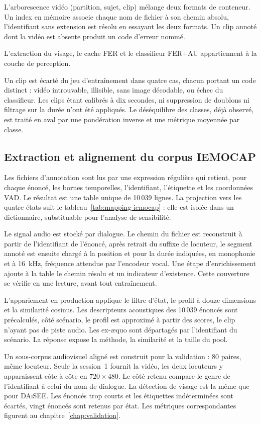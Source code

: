 L'arborescence vidéo (partition, sujet, clip) mélange deux formats de
conteneur. Un index en mémoire associe chaque nom de fichier à son
chemin absolu, l'identifiant sans extension est résolu en essayant
les deux formats. Un clip annoté dont la vidéo est absente produit un
code d'erreur nommé.

L'extraction du visage, le cache FER et le classifieur FER+AU
appartiennent à la couche de perception.

Un clip est écarté du jeu d'entraînement dans quatre cas, chacun
portant un code distinct : vidéo introuvable, illisible, sans image
décodable, ou échec du classifieur. Les clips étant calibrés à dix
secondes, ni suppression de doublons ni filtrage sur la durée n'ont
été appliqués. Le déséquilibre des classes, déjà observé, est traité
en aval par une pondération inverse et une métrique moyennée par
classe.

\subsection{Extraction et alignement du corpus IEMOCAP}
\label{subsec:impl-iemocap}

Les fichiers d'annotation sont lus par une expression régulière qui
retient, pour chaque énoncé, les bornes temporelles, l'identifiant,
l'étiquette et les coordonnées VAD. Le résultat est une table unique
de 10\,039 lignes. La projection vers les quatre états suit le
tableau~\ref{tab:mapping-iemocap} : elle est isolée dans un
dictionnaire, substituable pour l'analyse de sensibilité.

Le signal audio est stocké par dialogue. Le chemin du fichier est
reconstruit à partir de l'identifiant de l'énoncé, après retrait du
suffixe de locuteur, le segment annoté est ensuite chargé à la
position et pour la durée indiquées, en monophonie et à 16~kHz,
fréquence attendue par l'encodeur vocal. Une étape d'enrichissement
ajoute à la table le chemin résolu et un indicateur d'existence.
Cette couverture se vérifie en une lecture, avant tout entraînement.

L'appariement en production applique le filtre d'état, le profil à
douze dimensions et la similarité cosinus. Les descripteurs
acoustiques des 10\,039 énoncés sont précalculés, côté scénario, le
profil est approximé à partir des scores, le clip n'ayant pas de
piste audio. Les ex-æquo sont départagés par l'identifiant du
scénario. La réponse expose la méthode, la similarité et la taille
du pool.

Un sous-corpus audiovisuel aligné est construit pour la validation :
80 paires, même locuteur. Seule la session~1 fournit la vidéo, les
deux locuteurs y apparaissent côte à côte en $720 \times 480$. Le
côté retenu compare le genre de l'identifiant à celui du nom de
dialogue. La détection de visage est la même que pour
\textsc{DAiSEE}. Les énoncés trop courts et les étiquettes
indéterminées sont écartés, vingt énoncés sont retenus par état.
Les métriques correspondantes figurent au
chapitre~\ref{chap:validation}.

